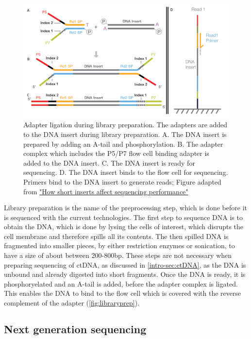 \begin{figure}[htb]
\centering
\includegraphics[width=.9\linewidth]{Figures/intro/LibraryPreparation.png}
\caption[Library preparation for NGS]{Adapter ligation during library preparation. The adapters are added to the DNA insert during library preparation. A. The DNA insert is prepared by adding an A-tail and phosphorylation. B. The adapter complex which includes the P5/P7 flow cell binding adapter is added to the DNA insert. C. The DNA insert is ready for sequencing. D. The DNA insert binds to the flow cell for sequencing. Primers bind to the DNA insert to generate reads; Figure adapted from \href{https://sapac.support.illumina.com/bulletins/2020/12/how-short-inserts-affect-sequencing-performance.html}{"How short inserts affect sequencing performance"}~\protect\cite{Illumina2020}}\label{fig:libraryprep}
\end{figure}

Library preparation is the name of the preprocessing step, which is done before it is sequenced with the current technologies. The first step to sequence DNA is to obtain the DNA, which is done by lysing the cells of interest, which disrupts the cell membrane and therefore spills all its contents. The then spilled DNA is fragmented into smaller pieces, by either restriction enzymes or sonication, to have a size of about between 200-800bp. These steps are not necessary when preparing sequencing of ctDNA, as discussed in \autoref{intro-sec:ctDNA}, as the DNA is unbound and already digested into short fragments.
Once the DNA is ready, it is phosphoryelated and an A-tail is added, before the adapter complex is ligated. This enables the DNA to bind to the flow cell which is covered with the reverse complement of the adapter (\autoref{fig:libraryprep}). 

\subsection{Next generation sequencing}
\label{intro-sec:ngs}

